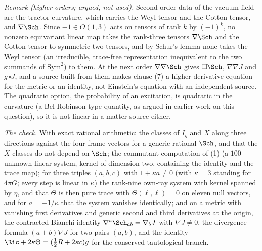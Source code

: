 \emph{Remark (higher orders; argued, not used).} Second-order data of the vacuum field are the tractor curvature, which carries the Weyl tensor and the Cotton tensor, and $\nabla\Sch$. Since $-1 \in O(1,3)$ acts on tensors of rank $k$ by $(-1)^{k}$, no nonzero equivariant linear map takes the rank-three tensors $\nabla\Sch$ and the Cotton tensor to symmetric two-tensors, and by Schur's lemma none takes the Weyl tensor (an irreducible, trace-free representation inequivalent to the two summands of $\mathrm{Sym}^2$) to them. At the next order $\nabla\nabla\Sch$ gives $\square\Sch$, $\nabla\nabla J$ and $g\,\square J$, and a source built from them makes clause (7) a higher-derivative equation for the metric or an identity, not Einstein's equation with an independent source. The quadratic option, the probability of an excitation, is quadratic in the curvature (a Bel-Robinson type quantity, as argued in earlier work on this question), so it is not linear in a matter source either.

\emph{The check.} With exact rational arithmetic: the classes of $I_g$ and $X$ along three directions against the four frame vectors for a generic rational $\Sch$, and that the $X$ classes do not depend on $\Sch$; the commutant computation of (1) (a $100$-unknown linear system, kernel of dimension two, containing the identity and the trace map); for three triples $(a,b,c)$ with $1 + \kappa a \neq 0$ (with $\kappa = 3$ standing for $4\pi G$; every step is linear in $\kappa$) the rank-nine own-ray system with kernel spanned by $\eta$, and that $\Theta$ is then pure trace with $\Theta(\ell,\ell) = 0$ on eleven null vectors, and for $a = -1/\kappa$ that the system vanishes identically; and on a metric with vanishing first derivatives and generic second and third derivatives at the origin, the contracted Bianchi identity $\nabla^a\Sch_{ab} = \nabla_b J$ with $\nabla J \neq 0$, the divergence formula $(a+b)\nabla J$ for two pairs $(a,b)$, and the identity $\Ric + 2\kappa\Theta = (\tfrac12 R + 2\kappa c)g$ for the conserved tautological branch.
